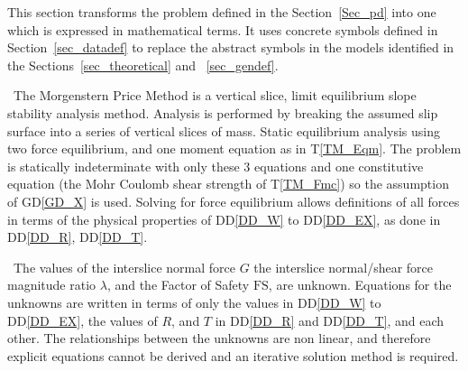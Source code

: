 \documentclass[12pt]{article}
\newcommand{\tref}[1]{T\ref{#1}}
\newcommand{\ddref}[1]{DD\ref{#1}}
\newcommand{\dref}[1]{GD\ref{#1}}
\begin{document}
This section transforms the problem defined in the
Section~\ref{Sec_pd} into one which is expressed in mathematical
terms. It uses concrete symbols defined in Section~\ref{sec_datadef}
to replace the abstract symbols in the models identified in the
Sections~\ref{sec_theoretical} and ~\ref{sec_gendef}.

~\newline\noindent The Morgenstern Price Method is a vertical slice,
limit equilibrium slope stability analysis method. Analysis is
performed by breaking the assumed slip surface into a series of
vertical slices of mass. Static equilibrium analysis using two force
equilibrium, and one moment equation as in \tref{TM_Eqm}. The problem
is statically indeterminate with only these 3 equations and one
constitutive equation (the Mohr Coulomb shear strength of
\tref{TM_Fmc}) so the assumption of \dref{GD_X} is used. Solving for
force equilibrium allows definitions of all forces in terms of the
physical properties of \ddref{DD_W} to \ddref{DD_EX}, as done in
\ddref{DD_R}, \ddref{DD_T}.

~\newline\noindent The values of the interslice normal force $G$ the
interslice normal/shear force magnitude ratio $\lambda$, and the
Factor of Safety $\text{FS}$, are unknown. Equations for the unknowns
are written in terms of only the values in \ddref{DD_W} to
\ddref{DD_EX}, the values of $R$, and $T$ in
\ddref{DD_R} and \ddref{DD_T}, and each other. The relationships
between the unknowns are non linear, and therefore explicit equations
cannot be derived and an iterative solution method is required.



~\newline

\end{document}
